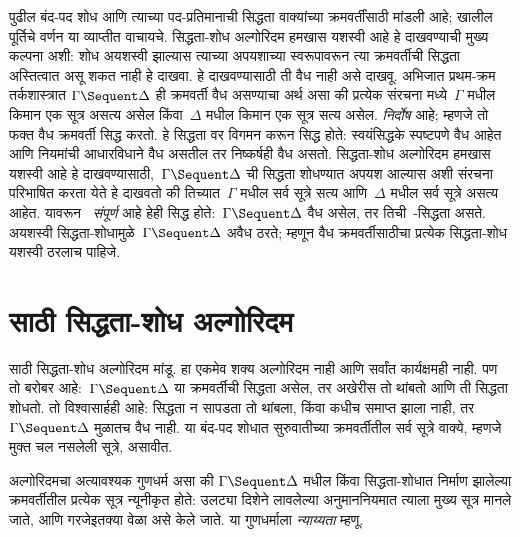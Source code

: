 पुढील बंद-पद शोध आणि त्याच्या पद-प्रतिमानाची सिद्धता
वाक्यांच्या क्रमवर्तींसाठी मांडली आहे; खालील पूर्तिचे
वर्णन या व्याप्तीत वाचायचे.
सिद्धता-शोध अल्गोरिदम हमखास यशस्वी आहे
हे दाखवण्याची मुख्य कल्पना अशी: शोध अयशस्वी
झाल्यास त्याच्या अपयशाच्या स्वरूपावरून त्या
क्रमवर्तीची सिद्धता अस्तित्वात असू शकत नाही हे दाखवा.
हे दाखवण्यासाठी ती वैध नाही असे दाखवू.
अभिजात प्रथम-क्रम तर्कशास्त्रात
$\Gamma \Sequent \Delta$ ही क्रमवर्ती वैध
असण्याचा अर्थ असा की प्रत्येक संरचना
मध्ये~$\Gamma$ मधील किमान एक सूत्र
असत्य असेल किंवा~$\Delta$ मधील किमान एक
सूत्र सत्य असेल.  \emph{निर्दोष}
आहे; म्हणजे तो फक्त वैध क्रमवर्ती सिद्ध करतो.
हे सिद्धता वर विगमन करून सिद्ध होते:
स्वयंसिद्धके स्पष्टपणे वैध आहेत आणि नियमांची
आधारविधाने वैध असतील तर निष्कर्षही वैध असतो.
सिद्धता-शोध अल्गोरिदम हमखास यशस्वी आहे हे
दाखवण्यासाठी,~$\Gamma \Sequent \Delta$ ची
सिद्धता शोधण्यात अपयश आल्यास अशी
संरचना परिभाषित करता येते हे दाखवतो
की तिच्यात~$\Gamma$ मधील सर्व सूत्रे
सत्य आणि~$\Delta$ मधील सर्व सूत्रे
असत्य आहेत. यावरून~ \emph{संपूर्ण}
आहे हेही सिद्ध होते:~$\Gamma \Sequent \Delta$
वैध असेल, तर तिची~-सिद्धता असते.
अयशस्वी सिद्धता-शोधामुळे~$\Gamma \Sequent \Delta$
अवैध ठरते; म्हणून वैध क्रमवर्तीसाठीचा प्रत्येक
सिद्धता-शोध यशस्वी ठरलाच पाहिजे.













\section{ साठी सिद्धता-शोध अल्गोरिदम}\label{pt:ps:sal:sec}

 साठी सिद्धता-शोध अल्गोरिदम मांडू.
हा एकमेव शक्य अल्गोरिदम नाही आणि सर्वांत कार्यक्षमही
नाही. पण तो बरोबर आहे:~$\Gamma \Sequent \Delta$
या क्रमवर्तीची सिद्धता असेल, तर अखेरीस तो
थांबतो आणि ती सिद्धता शोधतो. तो विश्वासार्हही
आहे: सिद्धता न सापडता तो थांबला, किंवा कधीच
समाप्त झाला नाही, तर~$\Gamma \Sequent \Delta$
मुळातच वैध नाही.
या बंद-पद शोधात सुरुवातीच्या क्रमवर्तीतील सर्व सूत्रे
वाक्ये, म्हणजे मुक्त चल नसलेली सूत्रे, असावीत.

अल्गोरिदमचा अत्यावश्यक गुणधर्म असा की
$\Gamma \Sequent \Delta$ मधील किंवा सिद्धता-शोधात
निर्माण झालेल्या क्रमवर्तीतील प्रत्येक सूत्र
न्यूनीकृत होते: उलट्या दिशेने लावलेल्या
अनुमाननियमात त्याला मुख्य सूत्र मानले जाते,
आणि गरजेइतक्या वेळा असे केले जाते.
या गुणधर्माला \emph{न्याय्यता} म्हणू.


